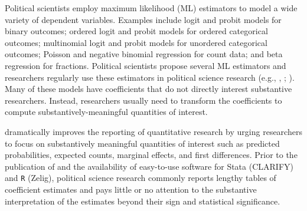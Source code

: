 \documentclass[11pt]{article}
\begin{document}
\thispagestyle{empty}

\onehalfspace



Political scientists employ maximum likelihood (ML) estimators to model a wide variety of dependent variables.
Examples include logit and probit models for binary outcomes; ordered logit and probit models for ordered categorical outcomes; multinomial logit and probit models for unordered categorical outcomes; Poisson and negative binomial regression for count data; and beta regression for fractions.
Political scientists propose several ML estimators and researchers regularly use these estimators in political science research (e.g., \citealt{Nagler1994}, \citealt{KatzKing1999}; \citealt{Mebane2000}).
Many of these models have coefficients that do not directly interest substantive researchers.
Instead, researchers usually need to transform the coefficients to compute substantively-meaningful quantities of interest.


\cite{KingTomzWittenberg2000} dramatically improves the reporting of quantitative research by urging researchers to focus on substantively meaningful quantities of interest such as predicted probabilities, expected counts, marginal effects, and first differences.
Prior to the publication of \cite{KingTomzWittenberg2000} and the availability of easy-to-use software for Stata (CLARIFY) and \texttt{R} (Zelig), political science research commonly reports lengthy tables of coefficient estimates and pays little or no attention to the substantive interpretation of the estimates beyond their sign and statistical significance.
\end{document}
